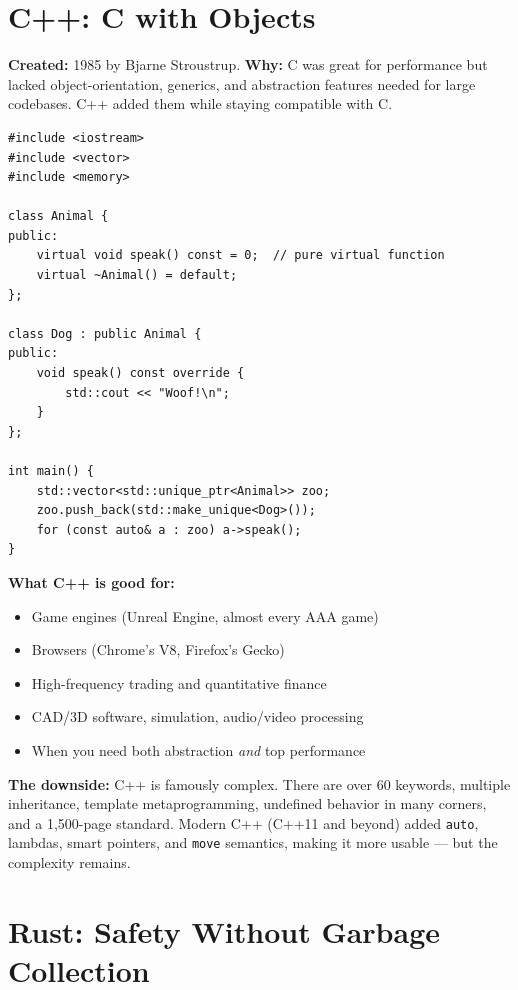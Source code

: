 \documentclass[11pt, letterpaper]{article}
\begin{document}
\section*{C++: C with Objects}

\textbf{Created:} 1985 by Bjarne Stroustrup. \textbf{Why:} C was great for performance but lacked object-orientation, generics, and abstraction features needed for large codebases. C++ added them while staying compatible with C.

\begin{lstlisting}[style=code, caption={C++: classes, vectors, smart pointers}]
#include <iostream>
#include <vector>
#include <memory>

class Animal {
public:
    virtual void speak() const = 0;  // pure virtual function
    virtual ~Animal() = default;
};

class Dog : public Animal {
public:
    void speak() const override {
        std::cout << "Woof!\n";
    }
};

int main() {
    std::vector<std::unique_ptr<Animal>> zoo;
    zoo.push_back(std::make_unique<Dog>());
    for (const auto& a : zoo) a->speak();
}
\end{lstlisting}

\textbf{What C++ is good for:}
\begin{itemize}[noitemsep]
  \item Game engines (Unreal Engine, almost every AAA game)
  \item Browsers (Chrome's V8, Firefox's Gecko)
  \item High-frequency trading and quantitative finance
  \item CAD/3D software, simulation, audio/video processing
  \item When you need both abstraction \emph{and} top performance
\end{itemize}

\textbf{The downside:} C++ is famously complex. There are over 60 keywords, multiple inheritance, template metaprogramming, undefined behavior in many corners, and a 1{,}500-page standard. Modern C++ (C++11 and beyond) added \texttt{auto}, lambdas, smart pointers, and \texttt{move} semantics, making it more usable --- but the complexity remains.

\section*{Rust: Safety Without Garbage Collection}
\end{document}
